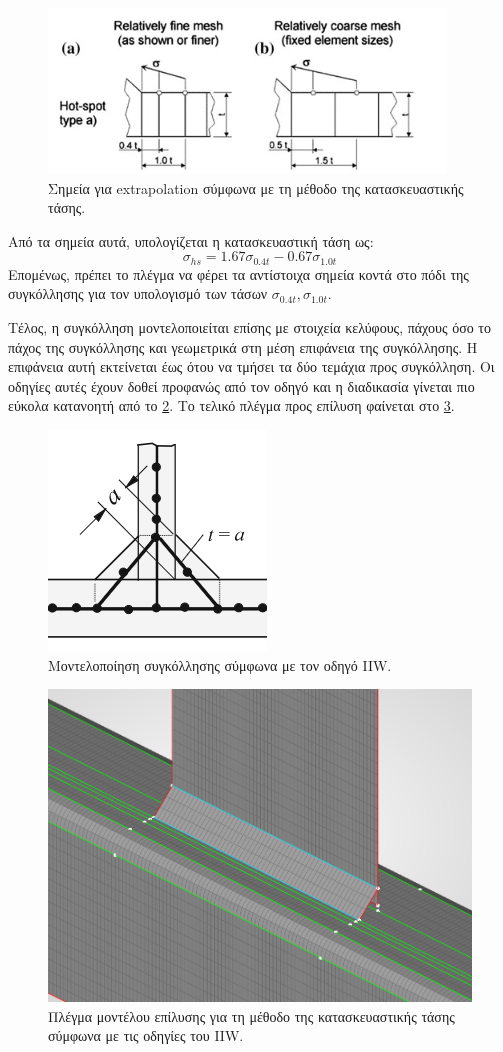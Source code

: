 \documentclass{article}
\begin{document}
\begin{figure}[H]
    \centering
    \includegraphics[width = 0.5\linewidth]{media/plegmahs.png}
    \caption{Σημεία για extrapolation σύμφωνα με τη μέθοδο της κατασκευαστικής τάσης.}
    \label{fig:plegmahs}
\end{figure}

Από τα σημεία αυτά, υπολογίζεται η κατασκευαστική τάση ως:
\begin{equation}
    \sigma_{hs} = 1.67 \sigma_{0.4t} -0.67 \sigma_{1.0t}
\end{equation}
Επομένως, πρέπει το πλέγμα να φέρει τα αντίστοιχα σημεία κοντά στο πόδι της συγκόλλησης για τον υπολογισμό των τάσων $\sigma_{0.4t}, \sigma_{1.0t}$.
\par Τέλος, η συγκόλληση μοντελοποιείται επίσης με στοιχεία κελύφους, πάχους όσο το πάχος της συγκόλλησης και γεωμετρικά στη μέση επιφάνεια της συγκόλλησης. Η επιφάνεια αυτή εκτείνεται έως ότου να τμήσει τα δύο τεμάχια προς συγκόλληση. Οι οδηγίες αυτές έχουν δοθεί προφανώς από τον οδηγό και η διαδικασία γίνεται πιο εύκολα κατανοητή από το \ref{fig:sygkpl}. Το τελικό πλέγμα προς επίλυση φαίνεται στο \ref{fig:grid}.

\begin{figure}[H]
    \centering
    \includegraphics[width = 0.2\linewidth]{media/sygkpl.png}
    \caption{Μοντελοποίηση συγκόλλησης σύμφωνα με τον οδηγό IIW.}
    \label{fig:sygkpl}
\end{figure}

\begin{figure}[H]
    \centering
    \includegraphics[width = 0.7\linewidth]{media/grid.png}
    \caption{Πλέγμα μοντέλου επίλυσης για τη μέθοδο της κατασκευαστικής τάσης σύμφωνα με τις οδηγίες του IIW.}
    \label{fig:grid}
\end{figure}
\end{document}
